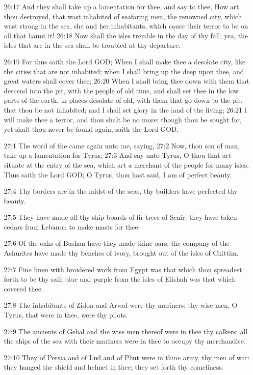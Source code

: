 26:17 And they shall take up a lamentation for thee, and say to thee,
How art thou destroyed, that wast inhabited of seafaring men, the
renowned city, which wast strong in the sea, she and her inhabitants,
which cause their terror to be on all that haunt it!  26:18 Now shall
the isles tremble in the day of thy fall; yea, the isles that are in
the sea shall be troubled at thy departure.

26:19 For thus saith the Lord GOD; When I shall make thee a desolate
city, like the cities that are not inhabited; when I shall bring up
the deep upon thee, and great waters shall cover thee; 26:20 When I
shall bring thee down with them that descend into the pit, with the
people of old time, and shall set thee in the low parts of the earth,
in places desolate of old, with them that go down to the pit, that
thou be not inhabited; and I shall set glory in the land of the
living; 26:21 I will make thee a terror, and thou shalt be no more:
though thou be sought for, yet shalt thou never be found again, saith
the Lord GOD.

27:1 The word of the \LORD came again unto me, saying, 27:2 Now, thou
son of man, take up a lamentation for Tyrus; 27:3 And say unto Tyrus,
O thou that art situate at the entry of the sea, which art a merchant
of the people for many isles, Thus saith the Lord GOD; O Tyrus, thou
hast said, I am of perfect beauty.

27:4 Thy borders are in the midst of the seas, thy builders have
perfected thy beauty.

27:5 They have made all thy ship boards of fir trees of Senir: they
have taken cedars from Lebanon to make masts for thee.

27:6 Of the oaks of Bashan have they made thine oars; the company of
the Ashurites have made thy benches of ivory, brought out of the isles
of Chittim.

27:7 Fine linen with broidered work from Egypt was that which thou
spreadest forth to be thy sail; blue and purple from the isles of
Elishah was that which covered thee.

27:8 The inhabitants of Zidon and Arvad were thy mariners: thy wise
men, O Tyrus, that were in thee, were thy pilots.

27:9 The ancients of Gebal and the wise men thereof were in thee thy
calkers: all the ships of the sea with their mariners were in thee to
occupy thy merchandise.

27:10 They of Persia and of Lud and of Phut were in thine army, thy
men of war: they hanged the shield and helmet in thee; they set forth
thy comeliness.


